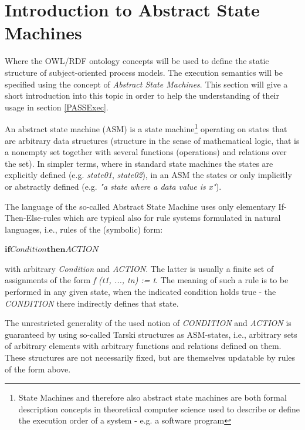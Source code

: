 \section{Introduction to Abstract State Machines}

Where the OWL/RDF ontology concepts will be used to define the static structure of subject-oriented process models. The execution semantics will be specified using the concept of \textit{Abstract State Machines}. This section will give a short introduction into this topic in order to help the understanding of their usage in section \ref{PASSExec}.

An abstract state machine (ASM) is a state machine\footnote{State Machines and therefore also abstract state machines are both formal description concepts in theoretical computer science used to describe or define the execution order of a system - e.g. a software program} operating on states that are arbitrary data structures (structure in the sense of mathematical logic, that is a nonempty set together with several functions (operations) and relations over the set). In simpler terms, where in standard state machines the states are explicitly defined (e.g. \textit{state01}, \textit{state02}), in an ASM the states or only implicitly or abstractly defined (e.g. \textit{"a state where a data value is x"}).

The language of the so-called Abstract State Machine uses only elementary If-Then-Else-rules which are typical also for rule systems formulated in natural languages, i.e., rules of the (symbolic) form:

\medskip
$\boldsymbol{if} \textit{Condition} \boldsymbol{then} \textit{ACTION}$
\medskip

with arbitrary \textit{Condition} and \textit{ACTION}. The latter is usually a finite set of assignments of the form \textit{f (t1, ..., tn) := t}. The meaning of such a rule is to be performed in any given state, when the indicated condition holds true - the \textit{CONDITION} there indirectly defines that state.

The unrestricted generality of the used notion of \textit{CONDITION} and \textit{ACTION} is guaranteed by using so-called Tarski structures as ASM-states, i.e., arbitrary sets of arbitrary elements with arbitrary functions and relations defined on them. These structures are not necessarily fixed, but are themselves updatable by rules of the form above. 



